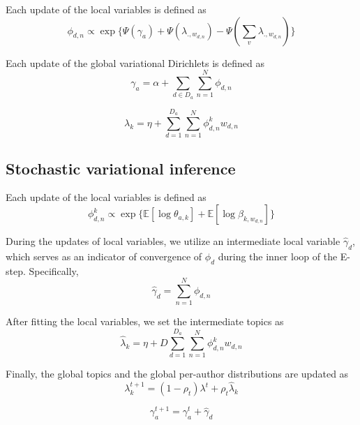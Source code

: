Each update of the local variables is defined as
\begin{equation}
\phi_{d,n} \propto \exp \{ \Psi(\gamma_a) + \Psi(\lambda_{.,w_{d,n}}) - \Psi(\sum_{v}{\lambda_{.,w_{d,n}}}) \}
\end{equation}

Each update of the global variational Dirichlets is defined as
\begin{equation}
\gamma_a = \alpha + \sum_{d \in D_a}{\sum_{n=1}^{N}{\phi_{d,n}}}
\end{equation}

\begin{equation}
\lambda_k = \eta + \sum_{d=1}^{D_a}{\sum_{n=1}^{N}{\phi^k_{d,n}w_{d,n}}}
\end{equation}



\subsection{Stochastic variational inference}

Each update of the local variables is defined as
\begin{equation}
\phi^k_{d,n} \propto \exp \{ \mathbb{E}[\log \theta_{a,k}] + \mathbb{E}[\log \beta_{k,w_{d,n}}] \}
\end{equation}

During the updates of local variables, we utilize an intermediate local variable $\hat{\gamma}_d$, which serves as an indicator of convergence of $\phi_{d}$ during the inner loop of the E-step. Specifically,
\begin{equation}
\hat{\gamma}_d = \sum_{n=1}^{N}{\phi_{d,n}}
\end{equation}


After fitting the local variables, we set the intermediate topics as
\begin{equation}
\hat{\lambda}_k = \eta + D \sum_{d=1}^{D_a}{\sum_{n=1}^{N}{\phi^k_{d,n}w_{d,n}}}
\end{equation}

Finally, the global topics and the global per-author distributions are updated as
\begin{equation}
\lambda^{t+1}_k = (1 - \rho_t) \lambda^{t} + \rho_t \hat{\lambda}_k
\end{equation}

\begin{equation}
\gamma^{t+1}_a = \gamma^{t}_a + \hat{\gamma}_d
\end{equation}